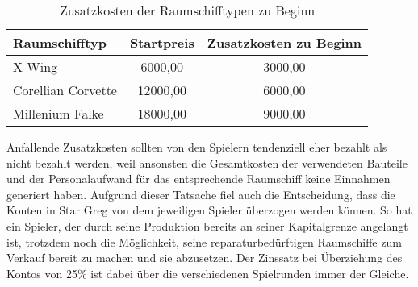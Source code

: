 \begin{table}[ht]\small
     \centering
     \begin{tabular}{ | l | c | c | }
          \hline
          Raumschifftyp & Startpreis & Zusatzkosten zu Beginn \\
          \hline \hline
          X-Wing &  6000,00\curr{} & 3000,00\curr{}\\ \hline
          Corellian Corvette & 12000,00\curr{} & 6000,00\curr{}\\ \hline
          Millenium Falke & 18000,00\curr{} & 9000,00\curr{} \\
          \hline
     \end{tabular}
     \caption{Zusatzkosten der Raumschifftypen zu Beginn}
     \label{tab:spielwelt-datenbasis-raumschiffe-zusammensetzung-2}
\end{table}

Anfallende Zusatzkosten sollten von den Spielern tendenziell eher bezahlt als nicht bezahlt werden, weil ansonsten die Gesamtkosten der verwendeten Bauteile und der Personalaufwand für das entsprechende Raumschiff keine Einnahmen generiert haben. Aufgrund dieser Tatsache fiel auch die Entscheidung, dass die Konten in Star Greg von dem jeweiligen Spieler überzogen werden können. So hat ein Spieler, der durch seine Produktion bereits an seiner Kapitalgrenze angelangt ist, trotzdem noch die Möglichkeit, seine reparaturbedürftigen Raumschiffe zum Verkauf bereit zu machen und sie abzusetzen. Der Zinssatz bei Überziehung des Kontos von 25\% ist dabei über die verschiedenen Spielrunden immer der Gleiche.

\autorende

